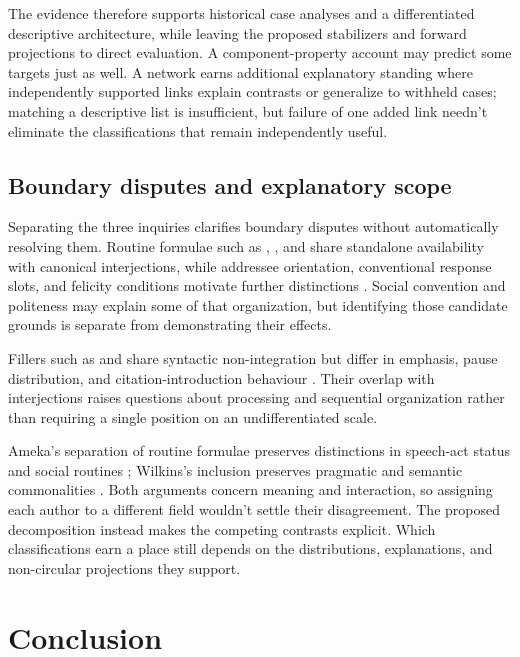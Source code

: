 \documentclass[12pt]{article}
\begin{document}
The evidence therefore supports historical case analyses and a differentiated descriptive architecture, while leaving the proposed stabilizers and forward projections to direct evaluation. A component-property account may predict some targets just as well. A network earns additional explanatory standing where independently supported links explain contrasts or generalize to withheld cases; matching a descriptive list is insufficient, but failure of one added link needn't eliminate the classifications that remain independently useful.

\subsection{Boundary disputes and explanatory scope}\label{sec:boundaries}

Separating the three inquiries clarifies boundary disputes without automatically resolving them. Routine formulae such as , , and  share standalone availability with canonical interjections, while addressee orientation, conventional response slots, and felicity conditions motivate further distinctions \citep[108--110]{ameka1992}. Social convention and politeness may explain some of that organization, but identifying those candidate grounds is separate from demonstrating their effects.

Fillers such as  and  share syntactic non-integration but differ in emphasis, pause distribution, and citation-introduction behaviour \citep[560, 567--572]{oconnell2005}. Their overlap with interjections raises questions about processing and sequential organization rather than requiring a single position on an undifferentiated scale.

Ameka's separation of routine formulae preserves distinctions in speech-act status and social routines \citep[109--110]{ameka1992}; Wilkins's inclusion preserves pragmatic and semantic commonalities \citep[142]{wilkins1992}. Both arguments concern meaning and interaction, so assigning each author to a different field wouldn't settle their disagreement. The proposed decomposition instead makes the competing contrasts explicit. Which classifications earn a place still depends on the distributions, explanations, and non-circular projections they support.

\section{Conclusion}\label{sec:conclusion}
\end{document}
